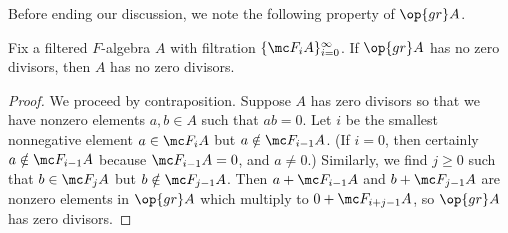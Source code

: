 \documentclass[../notes.tex]{subfiles}
\begin{document}
Before ending our discussion, we note the following property of $\op{gr}A$.
\begin{lemma} \label{lem:zero-divisor-gr}
	Fix a filtered $F$-algebra $A$ with filtration $\{\mc F_iA\}_{i=0}^\infty$. If $\op{gr}A$ has no zero divisors, then $A$ has no zero divisors.
\end{lemma}
\begin{proof}
	We proceed by contraposition. Suppose $A$ has zero divisors so that we have nonzero elements $a,b\in A$ such that $ab=0$. Let $i$ be the smallest nonnegative element $a\in\mc F_iA$ but $a\notin\mc F_{i-1}A$. (If $i=0$, then certainly $a\notin\mc F_{i-1}A$ because $\mc F_{i-1}A=0$, and $a\ne0$.) Similarly, we find $j\ge0$ such that $b\in\mc F_jA$ but $b\notin\mc F_{j-1}A$. Then $a+\mc F_{i-1}A$ and $b+\mc F_{j-1}A$ are nonzero elements in $\op{gr}A$ which multiply to $0+\mc F_{i+j-1}A$, so $\op{gr}A$ has zero divisors.
\end{proof}
\end{document}
